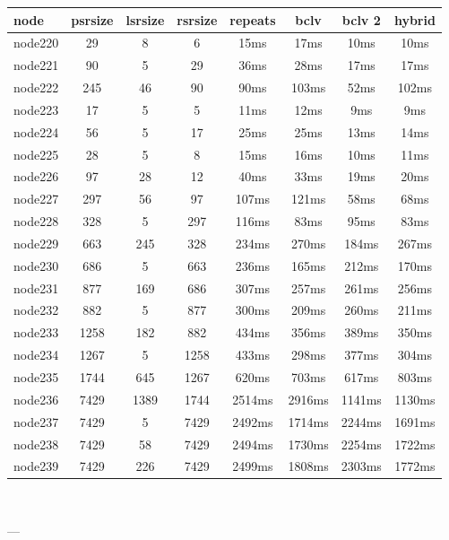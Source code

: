 \begin{tabular}{|l|c|c|c|c|c|c|c|}
\hline node & psrsize & lsrsize & rsrsize   & repeats & bclv & bclv 2 & hybrid\\
    \hline node220 & 29 & 8 & 6 & 15ms & 17ms & 10ms & 10ms\\
    \hline node221 & 90 & 5 & 29 & 36ms & 28ms & 17ms & 17ms\\
    \hline node222 & 245 & 46 & 90 & 90ms & 103ms & 52ms & 102ms\\
    \hline node223 & 17 & 5 & 5 & 11ms & 12ms & 9ms & 9ms\\
    \hline node224 & 56 & 5 & 17 & 25ms & 25ms & 13ms & 14ms\\
    \hline node225 & 28 & 5 & 8 & 15ms & 16ms & 10ms & 11ms\\
    \hline node226 & 97 & 28 & 12 & 40ms & 33ms & 19ms & 20ms\\
    \hline node227 & 297 & 56 & 97 & 107ms & 121ms & 58ms & 68ms\\
    \hline node228 & 328 & 5 & 297 & 116ms & 83ms & 95ms & 83ms\\
    \hline node229 & 663 & 245 & 328 & 234ms & 270ms & 184ms & 267ms\\
    \hline node230 & 686 & 5 & 663 & 236ms & 165ms & 212ms & 170ms\\
    \hline node231 & 877 & 169 & 686 & 307ms & 257ms & 261ms & 256ms\\
    \hline node232 & 882 & 5 & 877 & 300ms & 209ms & 260ms & 211ms\\
    \hline node233 & 1258 & 182 & 882 & 434ms & 356ms & 389ms & 350ms\\
    \hline node234 & 1267 & 5 & 1258 & 433ms & 298ms & 377ms & 304ms\\
    \hline node235 & 1744 & 645 & 1267 & 620ms & 703ms & 617ms & 803ms\\
    \hline node236 & 7429 & 1389 & 1744 & 2514ms & 2916ms & 1141ms & 1130ms\\
    \hline node237 & 7429 & 5 & 7429 & 2492ms & 1714ms & 2244ms & 1691ms\\
    \hline node238 & 7429 & 58 & 7429 & 2494ms & 1730ms & 2254ms & 1722ms\\
    \hline node239 & 7429 & 226 & 7429 & 2499ms & 1808ms & 2303ms & 1772ms\\

\hline
\end{tabular} \

---


